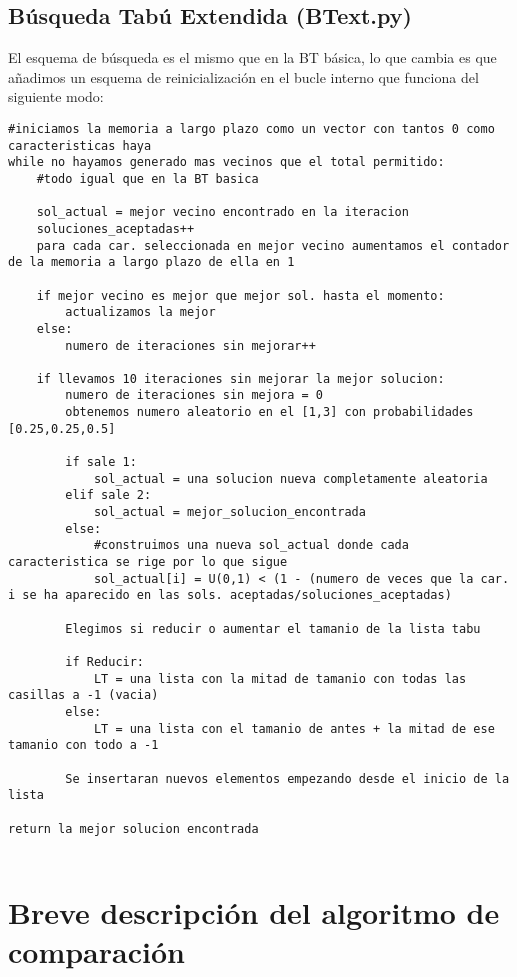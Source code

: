 \documentclass[10pt,a4paper]{article}
\begin{document}
\newpage
\subsection{\color[rgb]{0.0,0.0,0.51}Búsqueda Tabú Extendida (BText.py)}

El esquema de búsqueda es el mismo que en la BT básica, lo que cambia es que añadimos un esquema de reinicialización en el bucle interno que funciona del siguiente modo:\\

\begin{lstlisting}
#iniciamos la memoria a largo plazo como un vector con tantos 0 como caracteristicas haya
while no hayamos generado mas vecinos que el total permitido:
	#todo igual que en la BT basica
	
	sol_actual = mejor vecino encontrado en la iteracion
	soluciones_aceptadas++
	para cada car. seleccionada en mejor vecino aumentamos el contador de la memoria a largo plazo de ella en 1
	
	if mejor vecino es mejor que mejor sol. hasta el momento:
		actualizamos la mejor
	else:
		numero de iteraciones sin mejorar++
		
	if llevamos 10 iteraciones sin mejorar la mejor solucion:
		numero de iteraciones sin mejora = 0
		obtenemos numero aleatorio en el [1,3] con probabilidades [0.25,0.25,0.5]
		
		if sale 1:
			sol_actual = una solucion nueva completamente aleatoria
		elif sale 2:
			sol_actual = mejor_solucion_encontrada
		else:
			#construimos una nueva sol_actual donde cada caracteristica se rige por lo que sigue
			sol_actual[i] = U(0,1) < (1 - (numero de veces que la car. i se ha aparecido en las sols. aceptadas/soluciones_aceptadas)
			
		Elegimos si reducir o aumentar el tamanio de la lista tabu
		
		if Reducir:
			LT = una lista con la mitad de tamanio con todas las casillas a -1 (vacia)
		else:
			LT = una lista con el tamanio de antes + la mitad de ese tamanio con todo a -1
			
		Se insertaran nuevos elementos empezando desde el inicio de la lista
		
return la mejor solucion encontrada
		
\end{lstlisting}
\newpage
\section{\color[rgb]{0.0,0.0,0.21}Breve descripción del algoritmo de comparación}
\end{document}
